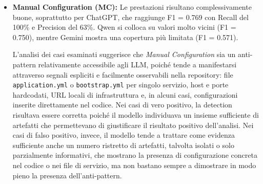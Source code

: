 \begin{itemize}
    Un esempio significativo è rappresentato dai casi in cui il modello considera sufficiente la presenza di 
    
    \texttt{spring-boot-starter-actuator} in un singolo microservizio, come \textit{beer-catalog}, per concludere che il sistema non soffra di \textit{Insufficient Monitoring}. Tuttavia, la presenza di Actuator in un solo servizio non dimostra che performance e failure siano davvero tracciate in modo globale, coerente ed efficace per tutti i microservizi del sistema.
    
    Per questo motivo, gli LLM tendono a sottostimare \textit{Insufficient Monitoring}: colgono correttamente segnali tecnici plausibili, ma li trattano troppo facilmente come prova dell'assenza dell'AP, anche quando il monitoring osservato potrebbe essere soltanto parziale, locale o incompleto.

    Bisogna comunque specificare che anche in questo caso, come accadeva per \textit{local logging} con il meccanismo di aggregazione, il tool di monitoraggio può essere esterno alla codebase e quindi non facilmente individuabile mediante gli indizi presenti.
    
    \item \textbf{Manual Configuration (MC):} Le prestazioni risultano complessivamente buone, soprattutto per ChatGPT, che raggiunge F1 = 0.769 con Recall del 100\% e Precision del 63\%. Qwen si colloca su valori molto vicini (F1 = 0.750), mentre Gemini mostra una copertura più limitata (F1 = 0.571).
    
    L'analisi dei casi esaminati suggerisce che \textit{Manual Configuration} sia un anti-pattern relativamente accessibile agli LLM, poiché tende a manifestarsi attraverso segnali espliciti e facilmente osservabili nella repository: file \texttt{application.yml} o \texttt{bootstrap.yml} per singolo servizio, host e porte hardcodati, URL locali di infrastruttura e, in alcuni casi, configurazioni inserite direttamente nel codice.
    Nei casi di vero positivo, la detection risultava essere corretta poiché il modello individuava un insieme sufficiente di artefatti che permettevano di giustificare il risultato positivo dell'analisi. 
    Nei casi di falso positivo, invece, il modello tende a trattare come evidenza sufficiente anche un numero ristretto di artefatti, talvolta isolati o solo parzialmente informativi, che mostrano la presenza di configurazione concreta nel codice o nei file di servizio, ma non bastano sempre a dimostrare in modo pieno la presenza dell'anti-pattern.


\end{itemize}
